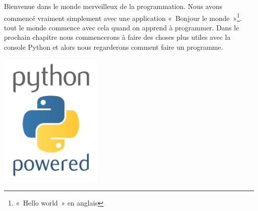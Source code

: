 Bienvenue dans le monde merveilleux de la programmation. Nous avons commencé vraiment simplement avec une 
application « Bonjour le monde »\footnote{« Hello world » en anglais}. tout le monde commence avec cela quand on apprend à programmer. Dans le prochain chapitre nous commencerons à faire des choses plus utiles avec la console Python et alors nous regarderons comment faire un programme.

 \vfill
\begin{center}
 \includegraphics[width=5cm]{images/python.pdf}
\end{center}
 \vfill

\newpage
\thispagestyle{empty}
